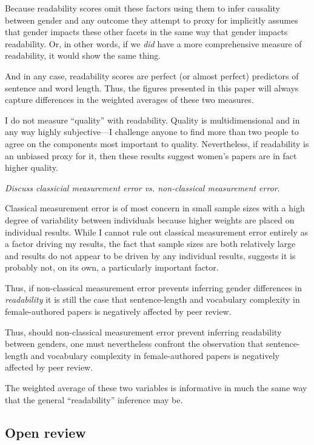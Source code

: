 Because readability scores omit these factors using them to infer causality between gender and any outcome they attempt to proxy for implicitly assumes that gender impacts these other facets in the same way that gender impacts readability. Or, in other words, if we \emph{did} have a more comprehensive measure of readability, it would show the same thing.

And in any case, readability scores are perfect (or almost perfect) predictors of sentence and word length. Thus, the figures presented in this paper will always capture differences in the weighted averages of these two measures.

I do not measure ``quality'' with readability. Quality is multidimensional and in any way highly subjective---I challenge anyone to find more than two people to agree on the components most important to quality. Nevertheless, if readability is an unbiased proxy for it, then these results suggest women's papers are in fact higher quality.

\emph{Discuss classicial measurement error vs. non-classical measurement error}.

Classical measurement error is of most concern in small sample sizes with a high degree of variability between individuals because higher weights are placed on individual results. While I cannot rule out classical measurement error entirely as a factor driving my results, the fact that sample sizes are both relatively large and results do not appear to be driven by any individual results, suggests it is probably not, on its own, a particularly important factor.

Thus, if non-classical measurement error prevents inferring gender differences in \emph{readability} it is still the case that sentence-length and vocabulary complexity in female-authored papers is negatively affected by peer review. 

Thus, should non-classical measurement error prevent inferring readability between genders, one must nevertheless confront the observation that sentence-length and vocabulary complexity in female-authored papers is negatively affected by peer review. 

The weighted average of these two variables is informative in much the same way that the general ``readability'' inference may be.

\subsection{Open review}
\label{openreview}

